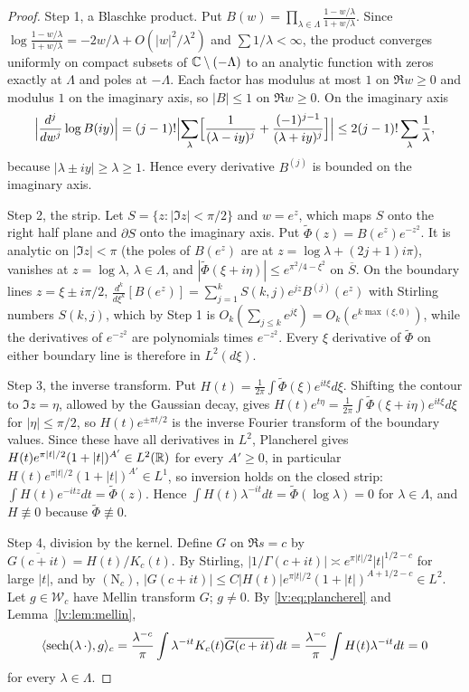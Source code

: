 \begin{proof}
Step 1, a Blaschke product. Put $B(w)=\prod_{\lambda\in\Lambda}\frac{1-w/\lambda}{1+w/\lambda}$. Since $\log\frac{1-w/\lambda}{1+w/\lambda}=-2w/\lambda+O(|w|^2/\lambda^2)$ and $\sum1/\lambda<\infty$, the product converges uniformly on compact subsets of $\mathbb{C}\setminus(-\Lambda)$ to an analytic function with zeros exactly at $\Lambda$ and poles at $-\Lambda$. Each factor has modulus at most $1$ on $\Re w\ge0$ and modulus $1$ on the imaginary axis, so $|B|\le1$ on $\Re w\ge0$. On the imaginary axis
\[
\Bigl|\frac{d^j}{dw^j}\log B(iy)\Bigr|=(j-1)!\Bigl|\sum_\lambda\Bigl[\frac1{(\lambda-iy)^j}+\frac{(-1)^{j-1}}{(\lambda+iy)^j}\Bigr]\Bigr|\le2(j-1)!\sum_\lambda\frac1\lambda,
\]
because $|\lambda\pm iy|\ge\lambda\ge1$. Hence every derivative $B^{(j)}$ is bounded on the imaginary axis.

Step 2, the strip. Let $S=\{z:|\Im z|<\pi/2\}$ and $w=e^z$, which maps $S$ onto the right half plane and $\partial S$ onto the imaginary axis. Put $\widetilde\Phi(z)=B(e^z)e^{-z^2}$. It is analytic on $|\Im z|<\pi$ (the poles of $B(e^z)$ are at $z=\log\lambda+(2j+1)i\pi$), vanishes at $z=\log\lambda$, $\lambda\in\Lambda$, and $|\widetilde\Phi(\xi+i\eta)|\le e^{\pi^2/4-\xi^2}$ on $\overline S$. On the boundary lines $z=\xi\pm i\pi/2$, $\frac{d^k}{d\xi^k}[B(e^z)]=\sum_{j=1}^kS(k,j)e^{jz}B^{(j)}(e^z)$ with Stirling numbers $S(k,j)$, which by Step 1 is $O_k(\sum_{j\le k}e^{j\xi})=O_k(e^{k\max(\xi,0)})$, while the derivatives of $e^{-z^2}$ are polynomials times $e^{-z^2}$. Every $\xi$ derivative of $\widetilde\Phi$ on either boundary line is therefore in $L^2(d\xi)$.

Step 3, the inverse transform. Put $H(t)=\frac1{2\pi}\int\widetilde\Phi(\xi)e^{it\xi}d\xi$. Shifting the contour to $\Im z=\eta$, allowed by the Gaussian decay, gives $H(t)e^{t\eta}=\frac1{2\pi}\int\widetilde\Phi(\xi+i\eta)e^{it\xi}d\xi$ for $|\eta|\le\pi/2$, so $H(t)e^{\pm\pi t/2}$ is the inverse Fourier transform of the boundary values. Since these have all derivatives in $L^2$, Plancherel gives $H(t)e^{\pi|t|/2}(1+|t|)^{A'}\in L^2(\mathbb{R})$ for every $A'\ge0$, in particular $H(t)e^{\pi|t|/2}(1+|t|)^{A'}\in L^1$, so inversion holds on the closed strip: $\int H(t)e^{-itz}dt=\widetilde\Phi(z)$. Hence $\int H(t)\lambda^{-it}dt=\widetilde\Phi(\log\lambda)=0$ for $\lambda\in\Lambda$, and $H\not\equiv0$ because $\widetilde\Phi\not\equiv0$.

Step 4, division by the kernel. Define $G$ on $\Re s=c$ by $\overline{G(c+it)}=H(t)/K_c(t)$. By Stirling, $|1/\Gamma(c+it)|\asymp e^{\pi|t|/2}|t|^{1/2-c}$ for large $|t|$, and by $(\mathrm N_c)$, $|G(c+it)|\le C|H(t)|e^{\pi|t|/2}(1+|t|)^{A+1/2-c}\in L^2$. Let $g\in\mathcal W_c$ have Mellin transform $G$; $g\ne0$. By \eqref{lv:eq:plancherel} and Lemma~\ref{lv:lem:mellin},
\[
\langle\operatorname{sech}(\lambda\,\cdot),g\rangle_c=\frac{\lambda^{-c}}\pi\int\lambda^{-it}K_c(t)\overline{G(c+it)}\,dt=\frac{\lambda^{-c}}\pi\int H(t)\lambda^{-it}dt=0
\]
for every $\lambda\in\Lambda$.
\end{proof}

